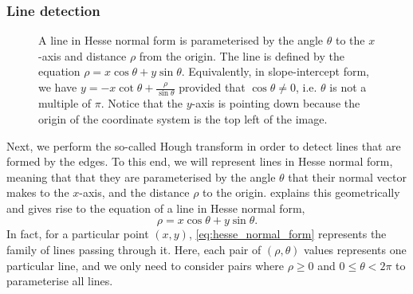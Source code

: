 \documentclass[../main.tex]{subfiles}
\begin{document}
\subsubsection{Line detection}
\begin{figure}
    \centering
    \caption[A line in Hesse normal form.]{A line in Hesse normal form is parameterised by the angle $\theta$ to the $x$-axis and distance $\rho$ from the origin. The line is defined by the equation $\rho = x \cos \theta + y \sin \theta$. Equivalently, in slope-intercept form, we have $y = -x \cot \theta + \frac{\rho}{\sin \theta}$ provided that $\cos \theta \neq 0$, i.e. $\theta$ is not a multiple of $\pi$. Notice that the $y$-axis is pointing down because the origin of the coordinate system is the top left of the image.}
    \label{fig:hesse_normal_form}
\end{figure}
Next, we perform the so-called Hough transform \cite{hough1962,duda1972} in order to detect lines that are formed by the edges.
To this end, we will represent lines in Hesse normal form, meaning that that they are parameterised by the angle $\theta$ that their normal vector makes to the $x$-axis, and the distance $\rho$ to the origin.
 explains this geometrically and gives rise to the equation of a line in Hesse normal form,
\begin{equation}
    \label{eq:hesse_normal_form}
    \rho = x \cos \theta + y \sin \theta.
\end{equation}
In fact, for a particular point $(x,y)$, \cref{eq:hesse_normal_form} represents the family of lines passing through it.
Here, each pair of $(\rho, \theta)$ values represents one particular line, and we only need to consider pairs where $\rho \geq 0$ and $0 \leq \theta < 2 \pi$ to parameterise all lines.
\end{document}
